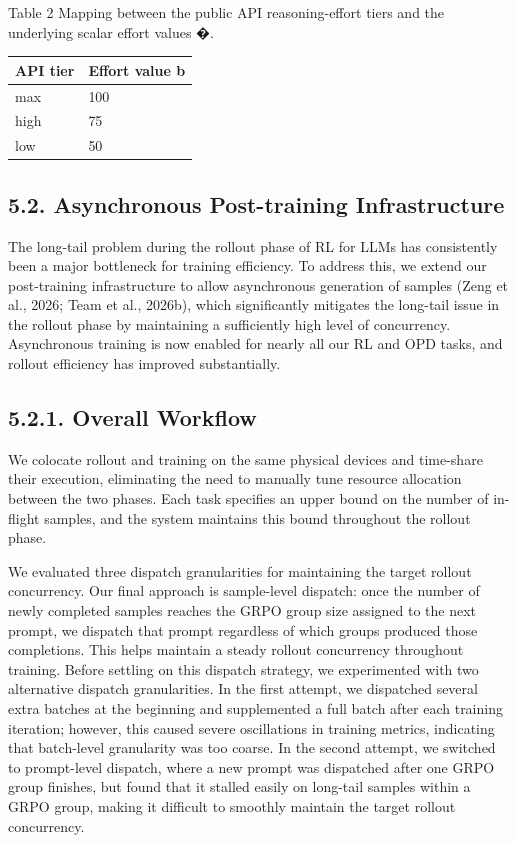 \documentclass[
  10
]{article}
\newcounter{none} %
\begin{document}
Table 2 \textbar{} Mapping between the public API reasoning-effort tiers
and the underlying scalar effort values �.

{\def\LTcaptype{none} %
\begin{longtable}[]{@{}|l|l|@{}}
\toprule\noalign{}
\endhead
\bottomrule\noalign{}
\endlastfoot
\hline
API tier & Effort value b \\
\hline
max & 100 \\
\hline
high & 75 \\
\hline
low & 50 \\
\hline
\end{longtable}
}

\subsection{5.2. Asynchronous Post-training
Infrastructure}\label{asynchronous-post-training-infrastructure}

The long-tail problem during the rollout phase of RL for LLMs has
consistently been a major bottleneck for training efficiency. To address
this, we extend our post-training infrastructure to allow asynchronous
generation of samples (Zeng et al., 2026; Team et al., 2026b), which
significantly mitigates the long-tail issue in the rollout phase by
maintaining a sufficiently high level of concurrency. Asynchronous
training is now enabled for nearly all our RL and OPD tasks, and rollout
efficiency has improved substantially.

\subsection{5.2.1. Overall Workflow}\label{overall-workflow}

We colocate rollout and training on the same physical devices and
time-share their execution, eliminating the need to manually tune
resource allocation between the two phases. Each task specifies an upper
bound on the number of in-flight samples, and the system maintains this
bound throughout the rollout phase.

We evaluated three dispatch granularities for maintaining the target
rollout concurrency. Our final approach is sample-level dispatch: once
the number of newly completed samples reaches the GRPO group size
assigned to the next prompt, we dispatch that prompt regardless of which
groups produced those completions. This helps maintain a steady rollout
concurrency throughout training. Before settling on this dispatch
strategy, we experimented with two alternative dispatch granularities.
In the first attempt, we dispatched several extra batches at the
beginning and supplemented a full batch after each training iteration;
however, this caused severe oscillations in training metrics, indicating
that batch-level granularity was too coarse. In the second attempt, we
switched to prompt-level dispatch, where a new prompt was dispatched
after one GRPO group finishes, but found that it stalled easily on
long-tail samples within a GRPO group, making it difficult to smoothly
maintain the target rollout concurrency.
\end{document}

